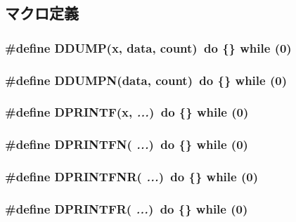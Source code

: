 \subsection{マクロ定義}
\hypertarget{trace_8hh_a556faf39d3fa9f7db5f344487ddbb397}{
\subsubsection[{DDUMP}]{\setlength{\rightskip}{0pt plus 5cm}\#define DDUMP(x, \/  data, \/  count)~do \{\} while (0)}}
\label{trace_8hh_a556faf39d3fa9f7db5f344487ddbb397}
\hypertarget{trace_8hh_aaab1bd1f895c0de5043ebfba35d1aba4}{
\subsubsection[{DDUMPN}]{\setlength{\rightskip}{0pt plus 5cm}\#define DDUMPN(data, \/  count)~do \{\} while (0)}}
\label{trace_8hh_aaab1bd1f895c0de5043ebfba35d1aba4}
\hypertarget{trace_8hh_aefe58fddf89e41edd783bf4c3e31d2c3}{
\subsubsection[{DPRINTF}]{\setlength{\rightskip}{0pt plus 5cm}\#define DPRINTF(x, \/   {\em ...})~do \{\} while (0)}}
\label{trace_8hh_aefe58fddf89e41edd783bf4c3e31d2c3}
\hypertarget{trace_8hh_a8743588cbe0ed2266fabe1090b16da34}{
\subsubsection[{DPRINTFN}]{\setlength{\rightskip}{0pt plus 5cm}\#define DPRINTFN( {\em ...})~do \{\} while (0)}}
\label{trace_8hh_a8743588cbe0ed2266fabe1090b16da34}
\hypertarget{trace_8hh_a9816941b3ff98b600ebcf1fdbd69422c}{
\subsubsection[{DPRINTFNR}]{\setlength{\rightskip}{0pt plus 5cm}\#define DPRINTFNR( {\em ...})~do \{\} while (0)}}
\label{trace_8hh_a9816941b3ff98b600ebcf1fdbd69422c}
\hypertarget{trace_8hh_ab50e5d70719a2562fe32d994959ad324}{
\subsubsection[{DPRINTFR}]{\setlength{\rightskip}{0pt plus 5cm}\#define DPRINTFR( {\em ...})~do \{\} while (0)}}

